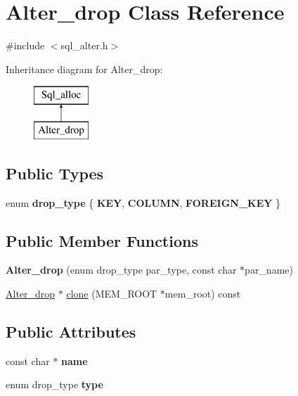 \hypertarget{classAlter__drop}{}\section{Alter\+\_\+drop Class Reference}
\label{classAlter__drop}


{\ttfamily \#include $<$sql\+\_\+alter.\+h$>$}

Inheritance diagram for Alter\+\_\+drop\+:\begin{figure}[H]
\begin{center}
\leavevmode
\includegraphics[height=2.000000cm]{classAlter__drop}
\end{center}
\end{figure}
\subsection*{Public Types}
\begin{DoxyCompactItemize}
\item 
\mbox{\label{classAlter__drop_a9adc87e52c29d637d4b1a2d5fd40e91d}} 
enum {\bfseries drop\+\_\+type} \{ {\bfseries K\+EY}, 
{\bfseries C\+O\+L\+U\+MN}, 
{\bfseries F\+O\+R\+E\+I\+G\+N\+\_\+\+K\+EY}
 \}
\end{DoxyCompactItemize}
\subsection*{Public Member Functions}
\begin{DoxyCompactItemize}
\item 
\mbox{\label{classAlter__drop_a97d6e8121c44ea11c4f9cb6a33cb4b91}} 
{\bfseries Alter\+\_\+drop} (enum drop\+\_\+type par\+\_\+type, const char $\ast$par\+\_\+name)
\item 
\mbox{\hyperlink{classAlter__drop}{Alter\+\_\+drop}} $\ast$ \mbox{\hyperlink{classAlter__drop_ae277011b26cca8a7451338793b3e1291}{clone}} (M\+E\+M\+\_\+\+R\+O\+OT $\ast$mem\+\_\+root) const
\end{DoxyCompactItemize}
\subsection*{Public Attributes}
\begin{DoxyCompactItemize}
\item 
\mbox{\label{classAlter__drop_a35b8b600b3d25e6bbc46a965ce4e3b3c}} 
const char $\ast$ {\bfseries name}
\item 
\mbox{\label{classAlter__drop_a41d82866cfe8a676940cd384a866138f}} 
enum drop\+\_\+type {\bfseries type}
\end{DoxyCompactItemize}
